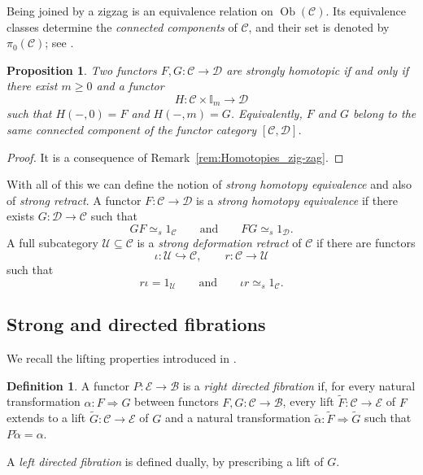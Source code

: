 \documentclass[12pt]{amsart}
\newtheorem{proposition}[teo]{Proposition}
\theoremstyle{definition}
\newtheorem{definition}[teo]{Definition}
\theoremstyle{remark}
\numberwithin{figure}{section}%
\newcommand{\Ba}{\mathcal{B}}
\newcommand{\CC}{\mathcal{C}}
\newcommand{\Dc}{\mathcal{D}}
\newcommand{\E}{\mathcal{E}}
\newcommand{\Uc}{\mathcal{U}}
\begin{document}
Being joined by a zigzag is an equivalence relation on
\(\operatorname{Ob}(\CC)\). Its equivalence classes determine the
\emph{connected components} of \(\CC\), and their set is denoted by
\(\pi_0(\CC)\); see
\cite[Chapter~IX, Section~3]{MacLaneCategories}.

\begin{proposition}
Two functors \(F,G\colon\CC\to\Dc\) are strongly homotopic if and only
if there exist \(m\geq0\) and a functor
\[
H\colon\CC\times\mathbb I_m\longrightarrow\Dc
\]
such that \(H(-,0)=F\) and \(H(-,m)=G\). Equivalently, \(F\) and \(G\)
belong to the same connected component of the functor category
\([\CC,\Dc]\).
\end{proposition}

\begin{proof}
    It is a consequence of Remark~\ref{rem:Homotopies_zig-zag}.
\end{proof}
With all of this we can define the notion of \emph{strong homotopy equivalence} and also of \emph{strong retract}. A functor \(F\colon\CC\to\Dc\) is a \emph{strong homotopy equivalence}
if there exists \(G\colon\Dc\to\CC\) such that
\[
GF\simeq_s1_\CC
\qquad\text{and}\qquad
FG\simeq_s1_\Dc.
\]
A full subcategory \(\Uc\subseteq\CC\) is a \emph{strong deformation
retract} of \(\CC\) if there are functors
\[
\iota\colon\Uc\hookrightarrow\CC,
\qquad
r\colon\CC\longrightarrow\Uc
\]
such that
\[
r\iota=1_\Uc
\qquad\text{and}\qquad
\iota r\simeq_s1_\CC.
\]
\subsection{Strong and directed fibrations}
\label{subsec:strong_directed_fibrations}

We recall the lifting properties introduced in
\cite{carcaciacampos2026weakstrongfibrationsfunctors,
DirectedHomotopyDatabases}.

\begin{definition}\label{def:right_directed_fibration_recall}
A functor \(P\colon\E\to\Ba\) is a \emph{right directed fibration} if,
for every natural transformation
\(
\alpha\colon F\Rightarrow G
\)
between functors \(F,G\colon\CC\to\Ba\), every lift
\(\widetilde F\colon\CC\to\E\) of \(F\) extends to a lift
\(\widetilde G\colon\CC\to\E\) of \(G\) and a natural transformation
\(
\widetilde\alpha\colon\widetilde F\Rightarrow\widetilde G
\)
such that \(P\widetilde\alpha=\alpha\).

A \emph{left directed fibration} is defined dually, by prescribing a lift
of \(G\).
\end{definition}
\end{document}
